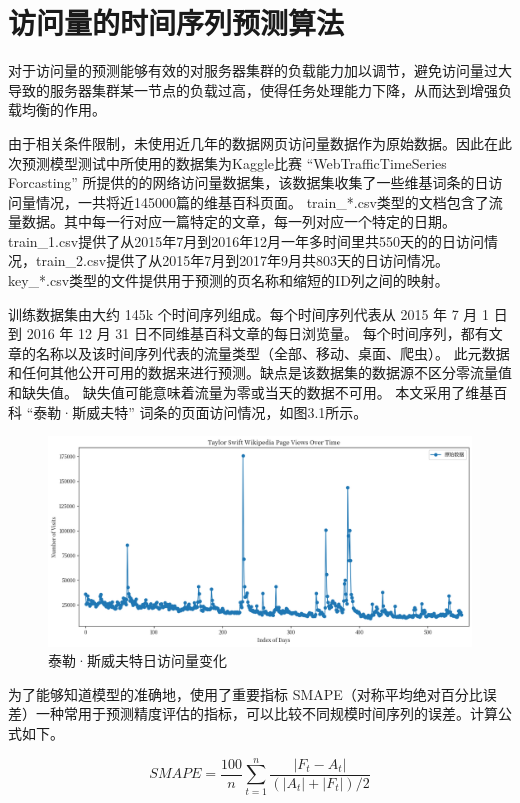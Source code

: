 \section{访问量的时间序列预测算法}

对于访问量的预测能够有效的对服务器集群的负载能力加以调节，避免访问量过大导致的服务器集群某一节点的负载过高，使得任务处理能力下降，从而达到增强负载均衡的作用。

由于相关条件限制，未使用近几年的数据网页访问量数据作为原始数据。因此在此次预测模型测试中所使用的数据集为Kaggle比赛
“WebTrafficTimeSeries Forcasting”
所提供的的网络访问量数据集，该数据集收集了一些维基词条的日访问量情况，一共将近145000篇的维基百科页面。
train\_*.csv类型的文档包含了流量数据。其中每一行对应一篇特定的文章，每一列对应一个特定的日期。
train\_1.csv提供了从2015年7月到2016年12月一年多时间里共550天的的日访问情况，train\_2.csv提供了从2015年7月到2017年9月共803天的日访问情况。
key\_*.csv类型的文件提供用于预测的页名称和缩短的ID列之间的映射。

训练数据集由大约 145k 个时间序列组成。每个时间序列代表从 2015 年 7 月 1 日到 2016 年 12 月 31 日不同维基百科文章的每日浏览量。
每个时间序列，都有文章的名称以及该时间序列代表的流量类型（全部、移动、桌面、爬虫）。
此元数据和任何其他公开可用的数据来进行预测。缺点是该数据集的数据源不区分零流量值和缺失值。
缺失值可能意味着流量为零或当天的数据不可用。
本文采用了维基百科 “泰勒·斯威夫特” 词条的页面访问情况，如图3.1所示。

\begin{figure}[htb]
  \centering
  \includegraphics[width=\textwidth]{figures/taylor_source.png}
  \caption{泰勒·斯威夫特日访问量变化}
\end{figure}

为了能够知道模型的准确地，使用了重要指标 SMAPE（对称平均绝对百分比误差）一种常用于预测精度评估的指标，可以比较不同规模时间序列的误差。计算公式如下。

\begin{equation}
  SMAPE={\frac{100}{n}}\sum_{t=1}^{n}{\frac{|F_{t}-A_{t}|}{(|A_{t}|+|F_{t}|)/2}}
\end{equation}

